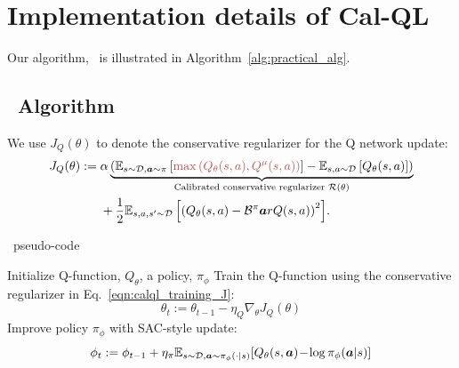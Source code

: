 \vspace{-0.2cm}
\section{Implementation details of Cal-QL}
\vspace{-0.2cm}
Our algorithm, \methodname\ is illustrated in Algorithm~\ref{alg:practical_alg}. 

\vspace{-0.2cm}
\subsection{\methodname\ Algorithm}
\vspace{-0.2cm}
We use $J_Q(\theta)$ to denote the conservative regularizer for the Q network update:
\begin{align}
    \label{eqn:calql_training_J}
    J_Q(\theta):=&\;{{\alpha \underbrace{\left(\mathbb{E}_{\bs \sim \mathcal{D}, \mathbf{a} \sim \pi} \brac{{\color[HTML]{B85450}{\max \left( Q_\theta(s,a), Q^\mu(s,a) \right)}} } - \mathbb{E}_{s, a \sim \mathcal{D}}\left[Q_\theta(s,a)\right]\right)}_{\text{Calibrated conservative regularizer }\mathcal{R}(\theta)}}}\\
    &\;+ \frac{1}{2} {\mathbb{E}_{s, a, s^\prime\sim \mathcal{D}}\left[\left(Q_\theta(s, a) - \bellman^\pi\mathbf{a}r{Q}(s, a)\right)^2 \right]}.
\end{align}

\begin{center}
\begin{minipage}{0.64\linewidth}
    \begin{algorithm}[H]
    \caption{\methodname\ pseudo-code}
    \label{alg:practical_alg}
    \begin{algorithmic}[1]
        \State Initialize Q-function, $Q_\theta$, a policy, $\pi_\phi$
            \State Train the Q-function using the conservative regularizer in Eq.~\ref{eqn:calql_training_J}:
            \begin{equation}
                \theta_t := \theta_{t-1} - \eta_Q \nabla_\theta J_Q(\theta)
            \end{equation}
            \State Improve policy $\pi_\phi$ with SAC-style update:
            \begin{equation}
                \phi_{t} := \phi_{t-1} + \eta_\pi \mathbb{E}_{s \sim \mathcal{D}, \boldsymbol{a} \sim \pi_\phi(\cdot|s)}[Q_\theta(s, \boldsymbol{a})\! -\! \log \pi_\phi(\boldsymbol{a}|s)]
            \end{equation}
        \EndFor
    \end{algorithmic}
    \end{algorithm}
\end{minipage}
\end{center}

